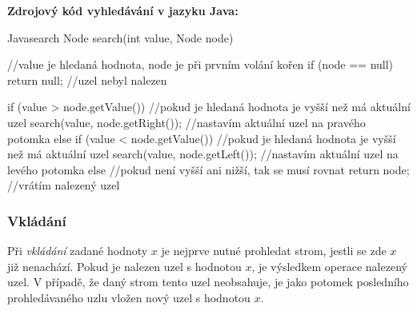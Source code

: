 \documentclass[
  biblatex=false,
  font=serif,
  glossaries=false,
  tables=false,
  theorems=false,
  index
]{kidiplom}
\begin{document}
\medskip \medskip \medskip
\noindent \textbf{Zdrojový kód vyhledávání v jazyku Java:}

\begin{kicode}{Java}{search}
Node search(int value, Node node) { //value je hledaná hodnota, node je při prvním volání kořen
	if (node == null) {
		return null; //uzel nebyl nalezen
	}
	
	if (value > node.getValue()) { //pokud je hledaná hodnota je vyšší než má aktuální uzel
		search(value, node.getRight()); //nastavím aktuální uzel na pravého potomka
	} else if (value < node.getValue()) { //pokud je hledaná hodnota je vyšší než má aktuální uzel
		search(value, node.getLeft()); //nastavím aktuální uzel na levého potomka
	} else { //pokud není vyšší ani nižší, tak se musí rovnat
		return node; //vrátím nalezený uzel
	}
}
\end{kicode}

\newpage
\subsubsection{Vkládání}
Při \textit{vkládání} zadané hodnoty $x$ je nejprve nutné prohledat strom, jestli se zde $x$ již nenachází. Pokud je nalezen uzel s hodnotou $x$, je výsledkem operace nalezený uzel. V případě, že daný strom tento uzel neobsahuje, je jako potomek posledního prohledávaného uzlu vložen nový uzel s hodnotou $x$. \\
\end{document}
